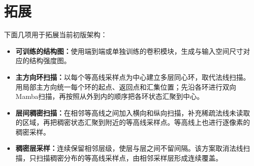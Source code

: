\section{拓展}
\label{sec:future}

下面几项用于拓展当前初版架构：
\begin{itemize}[leftmargin=*,itemsep=2pt,topsep=2pt]
    \item \textbf{可训练的结构图：}使用端到端或单独训练的卷积模块，生成与输入空间尺寸对应的结构强度图。
    \item \textbf{主方向环扫描：}以每个等高线采样点为中心建立多层同心环，取代法线扫描。用局部主方向统一每个环的起点、返回点和汇集位置；先沿各环进行双向Mamba扫描，再按照从外到内的顺序把各环状态汇聚到中心。
    \item \textbf{层间稠密扫描：}在相邻等高线之间加入横向和纵向扫描，补充稀疏法线未读取的区域，再把稠密状态汇聚到附近的等高线采样点。等高线上也进行逐像素的稠密采样。
    \item \textbf{稠密层采样：}连续保留相邻层级，使层与层之间不留间隔。该方案取消法线扫描，只扫描稠密分布的等高线采样点，由相邻采样层形成连续覆盖。
\end{itemize}
